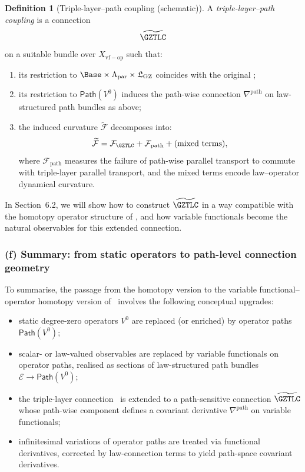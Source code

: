 \documentclass[11pt]{book}
\theoremstyle{plain}
\theoremstyle{definition}
\newtheorem{definition}[theorem]{Definition} \theoremstyle{remark}
\newcommand{\GZLS}{\ensuremath{\mathfrak{L}_{\mathrm{GZ}}}}       \newcommand{\GZLT}{\ensuremath{M_{!w}}}                           \newcommand{\GZLOC}{\ensuremath{A_M}}                             \newcommand{\GZLCurv}{\ensuremath{\mathcal{F}_{\mathrm{law}}}}
\begin{document}
\begin{definition}[Triple-layer–path coupling (schematic)]
A \emph{triple-layer–path coupling} is a connection
  \[
     \widetilde{\GZTLC}
  \]
  on a suitable bundle over $X_{\mathrm{vf-op}}$ such that:
  \begin{enumerate}[label=\roman*)]
    \item its restriction to $\Base\times\Lambda_{\mathrm{par}}\times
          \GZLS$ coincides with the original \GZTLC;
    \item its restriction to $\mathsf{Path}(V^0)$ induces the
          path-wise connection $\nabla^{\mathrm{path}}$ on
          law-structured path bundles as above;
    \item the induced curvature $\widetilde{\mathcal{F}}$ decomposes
          into:
          \[
             \widetilde{\mathcal{F}}
             =
             \mathcal{F}_{\GZTLC}
             + \mathcal{F}_{\mathrm{path}}
             + \text{(mixed terms)},
          \]
          where $\mathcal{F}_{\mathrm{path}}$ measures the failure of
          path-wise parallel transport to commute with triple-layer
          parallel transport, and the mixed terms encode law–operator
          dynamical curvature.
  \end{enumerate}
\end{definition}

In Section~6.2, we will show how to construct $\widetilde{\GZTLC}$ in a
way compatible with the homotopy operator structure of \GAlgebra, and
how variable functionals become the natural observables for this
extended connection.



\subsubsection*{(f) Summary: from static operators to path-level connection geometry}

To summarise, the passage from the homotopy version to the variable
functional–operator homotopy version of \GAlgebra\ involves the
following conceptual upgrades:

\begin{itemize}
  \item static degree-zero operators $V^0$ are replaced (or enriched)
        by operator paths $\mathsf{Path}(V^0)$;
  \item scalar- or law-valued observables are replaced by variable
        functionals on operator paths, realised as sections of
        law-structured path bundles $\mathcal{E}\to\mathsf{Path}(V^0)$;
  \item the triple-layer connection \GZTLC\ is extended to a
        path-sensitive connection $\widetilde{\GZTLC}$ whose path-wise
        component defines a covariant derivative
        $\nabla^{\mathrm{path}}$ on variable functionals;
  \item infinitesimal variations of operator paths are treated via
        functional derivatives, corrected by law-connection terms to
        yield path-space covariant derivatives.
\end{itemize}
\end{document}
